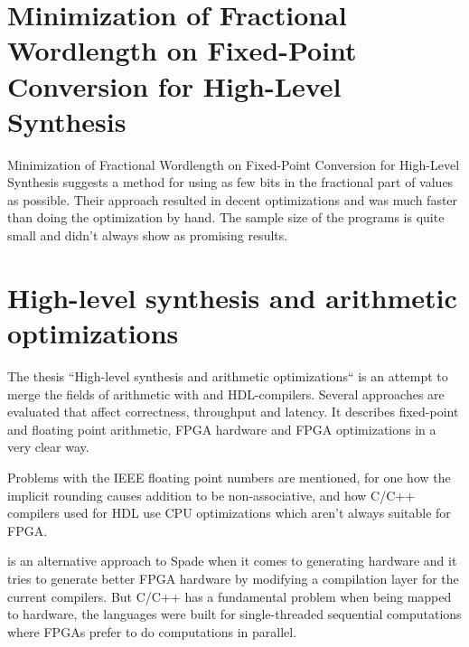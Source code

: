 \documentclass[msc,lith,english]{liuthesis}
\begin{document}
\section{Minimization of Fractional Wordlength on Fixed-Point Conversion for High-Level Synthesis}
Minimization of Fractional Wordlength on Fixed-Point Conversion for High-Level Synthesis suggests a method for using as few bits in the fractional part of values as possible. Their approach resulted in decent optimizations and was much faster than doing the optimization by hand. The sample size of the programs is quite small and didn't always show as promising results.

\cite{src:MinOfFrac}

\section{High-level synthesis and arithmetic optimizations}
The thesis ``High-level synthesis and arithmetic optimizations`` is an attempt to merge the fields of arithmetic with and HDL-compilers. Several approaches are evaluated that affect correctness, throughput and latency. It describes fixed-point and floating point arithmetic, FPGA hardware and FPGA optimizations in a very clear way.

Problems with the IEEE floating point numbers are mentioned, for one how the implicit rounding causes addition to be non-associative, and how C/C++ compilers used for HDL use CPU optimizations which aren't always suitable for FPGA.

\author{src:HLSandOpt} is an alternative approach to Spade when it comes to generating hardware and it tries to generate better FPGA hardware by modifying a compilation layer for the current compilers. But C/C++ has a fundamental problem when being mapped to hardware, the languages were built for single-threaded sequential computations where FPGAs prefer to do computations in parallel.

\cite{src:HLSandOpt}

\end{document}
